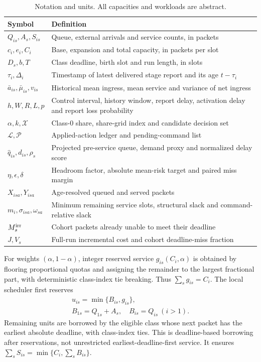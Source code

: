 \documentclass{IEEEoj}
\renewcommand{\arraystretch}{1.15}
\begin{document}
\begin{table}[htbp]\centering\footnotesize\renewcommand{\arraystretch}{1.04}
\caption{Notation and units. All capacities and workloads are abstract.}\label{tab:notation}
\begin{tabular}{p{32mm}p{117mm}}\toprule
Symbol & Definition\\\midrule
$Q_{is},A_s,S_{is}$ & Queue, external arrivals and service counts, in packets\\
$c_i,e_i,C_i$ & Base, expansion and total capacity, in packets per slot\\
$D_s,b,T$ & Class deadline, birth slot and run length, in slots\\
$\tau_i,\Delta_i$ & Timestamp of latest delivered stage report and its age $t-\tau_i$\\
$\bar a_{is},\bar\mu_{is},v_{is}$ & Historical mean ingress, mean service and variance of net ingress\\
$h,W,R,L,p$ & Control interval, history window, report delay, activation delay and report loss probability\\
$\alpha,k,\mathcal X$ & Class-0 share, share-grid index and candidate decision set\\
$\mathcal L,\mathcal P$ & Applied-action ledger and pending-command list\\
$\widehat q_{is},d_{is},\rho_s$ & Projected pre-service queue, demand proxy and normalized delay score\\
$\eta,\epsilon,\delta$ & Headroom factor, absolute mean-risk target and paired miss margin\\
$X_{isa},Y_{isa}$ & Age-resolved queued and served packets\\
$m_i,\sigma_{isa},\omega_{sa}$ & Minimum remaining service slots, structural slack and command-relative slack\\
$M_s^{\rm irr}$ & Cohort packets already unable to meet their deadline\\
$J,V_s$ & Full-run incremental cost and cohort deadline-miss fraction\\\bottomrule
\end{tabular}
\end{table}


For weights $(\alpha,1-\alpha)$, integer reserved service
$g_{is}(C_i,\alpha)$ is obtained by flooring proportional quotas and assigning
the remainder to the largest fractional part, with deterministic class-index
tie breaking. Thus $\sum_s g_{is}=C_i$.
The local scheduler first reserves
\begin{equation}
 \begin{gathered}u_{is}=\min\{B_{is},g_{is}\},\\B_{1s}=Q_{1s}+A_s,\quad B_{is}=Q_{is}\ (i>1).\end{gathered}
\end{equation}
Remaining units are borrowed by the eligible class whose next packet has the
earliest absolute deadline, with class-index ties. This is deadline-based
borrowing after reservations, not unrestricted earliest-deadline-first service.
It ensures $\sum_s S_{is}=\min\{C_i,\sum_s B_{is}\}$.
\end{document}
